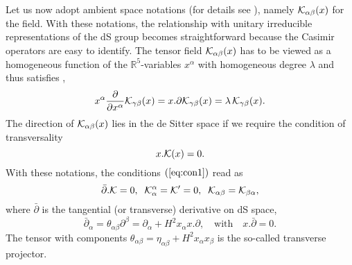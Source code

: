 \documentclass[a4paper,11pt,showpacs,preprintnumbers]{revtex4}
\def\setR{\mathbb{R}}
\begin{document}
Let us now adopt ambient space notations (for details see
\cite{fr}), namely ${\cal K}_{\alpha\beta}(x)$ for the field. With
these notations, the relationship with unitary irreducible
representations of the dS group becomes straightforward  because
the Casimir operators are easy to identify. The tensor field
${\cal K}_{\alpha\beta}(x)$ has to be viewed as a homogeneous
function of the $\setR^5$-variables $x^{\alpha}$ with homogeneous
degree $\lambda$ and thus satisfies ,
\begin{equation}
x^{\alpha}\frac{\partial }{\partial x^{\alpha}}{\cal
K}_{\gamma\beta}(x)= x.\partial {\cal
K}_{\gamma\beta}(x)=\lambda\, {\cal K}_{\gamma\beta}(x).
\end{equation}
The direction of ${\cal K}_{\alpha\beta}(x)$  lies in the de
Sitter space if we require the condition of transversality
\cite{di}
\begin{equation}
x.{\cal K}(x)=0. \label{eq:tra}
\end{equation}
With these notations, the conditions $(\ref{eq:con1})$ read as
\begin{equation}
\bar \partial. {\cal K}=0,\;\; {\cal K}_{\alpha}^{\alpha}={\cal
K}'=0,\;\; {\cal K}_{\alpha\beta}={\cal K}_{\beta\alpha},
\label{eq:con2}
\end{equation}
where $\bar\partial$ is the tangential (or transverse) derivative
on dS space,
\begin{equation}
\bar\partial_\alpha=\theta_{\alpha\beta}\partial^\beta=\partial_\alpha
+H^2x_\alpha x.\partial,\quad\mbox{with}\quad x.\bar\partial=0.
\end{equation}
The tensor with components
$\theta_{\alpha\beta}=\eta_{\alpha\beta}+H^2x_{\alpha}x_{ \beta}$
is the so-called transverse projector.
\end{document}
